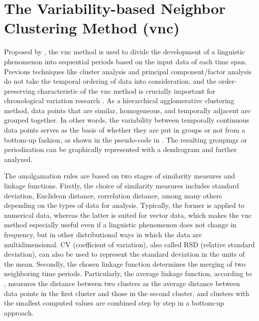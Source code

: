 \section{The Variability-based Neighbor Clustering Method (\acrshort{vnc})}
Proposed by \textcite{gries2012variability}, the \gls{vnc} method is used to divide the development of a linguistic phenomenon into sequential periods based on the input data of each time span. Previous techniques like cluster analysis and principal component/factor analysis do not take the temporal ordering of data into consideration, and the order-preserving characteristic of the \gls{vnc} method is crucially important for chronological variation research \parencite{moisl2015cluster}. As a hierarchical agglomerative clustering method, data points that are similar, homogeneous, and temporally adjacent are grouped together. In other words, the variability between temporally continuous data points serves as the basis of whether they are put in groups or not from a bottom-up fashion, as shown in the pseudo-code in . The resulting groupings or periodization can be graphically represented with a dendrogram and further analyzed.

The amalgamation rules are based on two stages of similarity measures and linkage functions. Firstly, the choice of similarity measures includes standard deviation, Euclidean distance, correlation distance, among many others depending on the types of data for analysis. Typically, the former is applied to numerical data, whereas the latter is suited for vector data, which makes the \gls{vnc} method especially useful even if a linguistic phenomenon does not change in frequency, but in other distributional ways in which the data are multidimensional. CV (coefficient of variation), also called RSD (relative standard deviation), can also be used to represent the standard deviation in the units of the mean. Secondly, the chosen linkage function determines the merging of two neighboring time periods. Particularly, the average linkage function, according to , measures the distance between two clusters as the average distance between data points in the first cluster and those in the second cluster, and clusters with the smallest computed values are combined step by step in a bottom-up approach.

